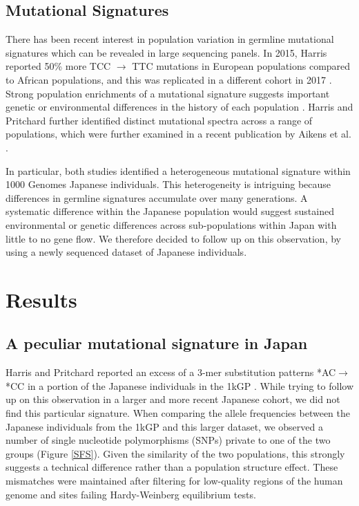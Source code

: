 \documentclass[
11pt, %
oneside, %
english, %
doublespacing, %
headsepline, %
chapterinoneline, %
]{MastersDoctoralThesis} %
\begin{document}
\subsection{Mutational Signatures}
There has been recent interest in population variation in germline mutational signatures which can be revealed in large sequencing panels. 
In 2015, Harris reported 50\% more TCC ${\rightarrow}$ TTC mutations in European populations compared to African populations, and this was replicated in a different cohort in 2017 \citep{Harris2015a, Harris2017a, Mathieson2017a}. 
Strong population enrichments of a mutational signature suggests important genetic or environmental differences in the history of each population \citep{Harris2015a, Harris2017a}. 
Harris and Pritchard further identified distinct mutational spectra across a range of populations, which were further examined in a recent publication by Aikens et al. \citep{Harris2017a,Aikens2018}.
 
In particular, both studies  identified a heterogeneous mutational signature within 1000 Genomes Japanese individuals.
This heterogeneity is intriguing because differences in germline signatures accumulate over many generations.
A systematic difference within the Japanese population would suggest sustained environmental or genetic differences across sub-populations within Japan with little to no gene flow.
We therefore decided to follow up on this observation, by using a newly sequenced dataset of Japanese individuals. 

\section{Results}
\subsection{A peculiar mutational signature in Japan}
Harris and Pritchard reported an excess of a 3-mer substitution patterns *AC${\rightarrow}$*CC in a portion of the Japanese individuals in the 1kGP \citep{Harris2017a}.
While trying to follow up on this observation in a larger and more recent Japanese cohort, we did not find this particular signature.
When comparing the allele frequencies between the Japanese individuals from the 1kGP and this larger dataset, we observed a number of single nucleotide polymorphisms (SNPs) private to one of the two groups (Figure \ref{SFS}).
Given the similarity of the two populations, this strongly suggests a technical difference rather than a population structure effect.
These mismatches were maintained after filtering for low-quality regions of the human genome and sites failing Hardy-Weinberg equilibrium tests.
\end{document}
